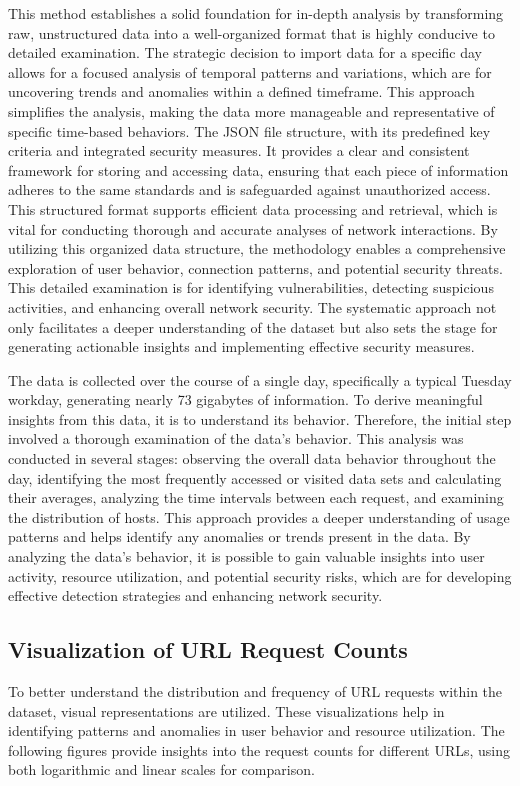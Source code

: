 This method establishes a solid foundation for in-depth analysis by transforming raw, unstructured data into a well-organized format that is highly conducive to detailed examination. The strategic decision to import data for a specific day allows for a focused analysis of temporal patterns and variations, which are for uncovering trends and anomalies within a defined timeframe. This approach simplifies the analysis, making the data more manageable and representative of specific time-based behaviors. The JSON file structure, with its predefined key criteria and integrated security measures. It provides a clear and consistent framework for storing and accessing data, ensuring that each piece of information adheres to the same standards and is safeguarded against unauthorized access. This structured format supports efficient data processing and retrieval, which is vital for conducting thorough and accurate analyses of network interactions. By utilizing this organized data structure, the methodology enables a comprehensive exploration of user behavior, connection patterns, and potential security threats. This detailed examination is  for identifying vulnerabilities, detecting suspicious activities, and enhancing overall network security. The systematic approach not only facilitates a deeper understanding of the dataset but also sets the stage for generating actionable insights and implementing effective security measures.

The data is collected over the course of a single day, specifically a typical Tuesday workday, generating nearly 73 gigabytes of information. To derive meaningful insights from this data, it is to understand its behavior. Therefore, the initial step involved a thorough examination of the data's behavior. This analysis was conducted in several stages: observing the overall data behavior throughout the day, identifying the most frequently accessed or visited data sets and calculating their averages, analyzing the time intervals between each request, and examining the distribution of hosts. This approach provides a deeper understanding of usage patterns and helps identify any anomalies or trends present in the data. By analyzing the data's behavior, it is possible to gain valuable insights into user activity, resource utilization, and potential security risks, which are  for developing effective detection strategies and enhancing network security.

\subsection{Visualization of URL Request Counts}
To better understand the distribution and frequency of URL requests within the dataset, visual representations are utilized. These visualizations help in identifying patterns and anomalies in user behavior and resource utilization. The following figures provide insights into the request counts for different URLs, using both logarithmic and linear scales for comparison.

